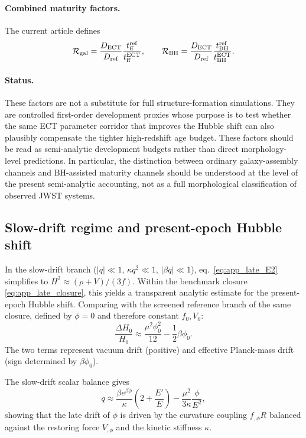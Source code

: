 \documentclass[11pt,a4paper]{article}
\numberwithin{equation}{section}
\begin{document}
\paragraph{Combined maturity factors.}
The current article defines
\begin{equation}
\mathcal R_{\rm gal}
=
\frac{D_{\rm ECT}}{D_{\rm ref}}
\frac{t_{\rm ff}^{\rm ref}}{t_{\rm ff}^{\rm ECT}},
\qquad
\mathcal R_{\rm BH}
=
\frac{D_{\rm ECT}}{D_{\rm ref}}
\frac{t_{\rm BH}^{\rm ref}}{t_{\rm BH}^{\rm ECT}}.
\label{eq:ect_maturity_factors}
\end{equation}

\paragraph{Status.}
These factors are not a substitute for full structure-formation
simulations.
They are controlled first-order development proxies whose purpose is to
test whether the same ECT parameter corridor that improves the Hubble
shift can also plausibly compensate the tighter high-redshift age
budget.
These factors should be read as semi-analytic development budgets rather
than direct morphology-level predictions.
In particular, the distinction between ordinary galaxy-assembly channels
and BH-assisted maturity channels should be understood at the level of
the present semi-analytic accounting, not as a full morphological
classification of observed JWST systems.

\subsection{Slow-drift regime and present-epoch Hubble shift}

In the slow-drift branch ($|q|\ll 1$, $\kappa q^2\ll 1$,
$|\beta q|\ll 1$), eq.~\eqref{eq:app_late_E2} simplifies to
$H^2\approx (\rho+V)/(3f)$.
Within the benchmark closure \eqref{eq:app_late_closure}, this yields a
transparent analytic estimate for the present-epoch Hubble shift.
Comparing with the screened reference branch of the same closure,
defined by $\phi=0$ and therefore constant $f_0,V_0$:
\begin{equation}
\frac{\Delta H_0}{H_0}
\approx
\frac{\mu^2\phi_0^2}{12}
-\frac12\beta \phi_0.
\label{eq:app_late_deltaH}
\end{equation}
The two terms represent vacuum drift (positive) and effective
Planck-mass drift (sign determined by $\beta \phi_0$).

The slow-drift scalar balance gives
\begin{equation}
q
\approx
\frac{\beta e^{\beta \phi}}{\kappa}
\left(2+\frac{E'}{E}\right)
-
\frac{\mu^2}{3\kappa}\frac{\phi}{E^2},
\label{eq:app_late_q}
\end{equation}
showing that the late drift of $\phi$ is driven by the curvature
coupling $f_{,\phi}R$ balanced against the restoring force $V_{,\phi}$
and the kinetic stiffness $\kappa$.
\end{document}

